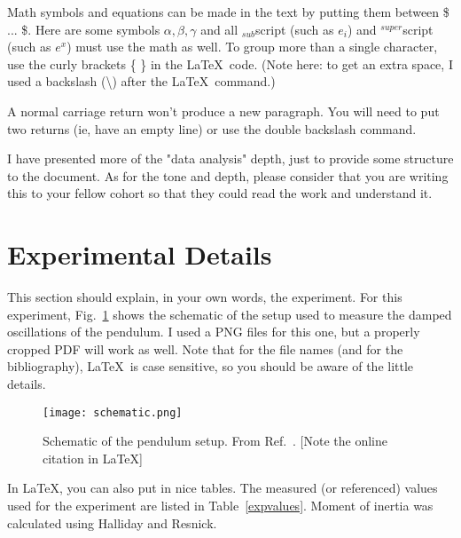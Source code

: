 \documentclass[prb,preprint,groupaddress,showpacs,superbib,floats]{revtex4-1}
\begin{document}
Math symbols and equations can be made in the text by putting them between \$ ... \$.  Here are some symbols $ \alpha, \beta, \gamma $ and all $_{sub}$script (such as $e_i$) and $^{super}$script (such as $e^x$) must use the math as well.  To group more than a single character, use the curly brackets \{ \} in the \LaTeX \ code. (Note here: to get an extra space, I used a backslash (\textbackslash) after the \LaTeX \ command.)

A normal carriage return won't produce a new paragraph.  You will need to put two returns (ie, have an empty line) or use the double backslash command.

I have presented more of the "data analysis" depth, just to provide some structure to the document.  As for the tone and depth, please consider that you are writing this to your fellow cohort so that they could read the work and understand it.


\section{Experimental Details}\label{experiment}

This section should explain, in your own words, the experiment.  For this experiment, Fig.~\ref{schematic} shows the schematic of the setup used to measure the damped oscillations of the pendulum.  I used a PNG files for this one, but a properly cropped PDF will work as well.  Note that for the file names (and for the bibliography), \LaTeX \ is case sensitive, so you should be aware of the little details.


%
\begin{figure}[h]
\centering
\texttt{[image: schematic.png]}
\caption{Schematic of the pendulum setup.  From Ref.~. [Note the online citation in \LaTeX]}
\label{schematic}
\end{figure}

In \LaTeX, you can also put in nice tables.  The measured (or referenced) values used for the experiment are listed in Table~\ref{expvalues}.  Moment of inertia was calculated using Halliday and Resnick.\cite{Halliday13}

%
\end{document}
